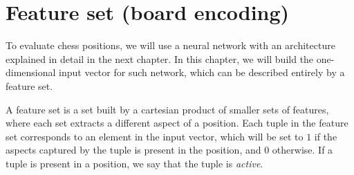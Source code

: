 \newcommand{\white}{\fullmoon}
\newcommand{\black}{\newmoon}

\newcommand{\bigtimes}{\mathop{\raisebox{-0.5ex}{\scalebox{2}{$\times$}}}}

\newcommand{\pieceBoard}{
    \newcount\pieceindex
    \setcounter{pieceindex}{0}
    \raisebox{-7ex}{
        \centering
        \chessboard[
            tinyboard,
            showmover=false,
            margin=false,
            padding=false,
            hlabel=false,
            vlabel=false,
            pgfstyle={text},
            text=\fontsize{1.2ex}{1.2ex}\bfseries\sffamily \currentwq,
            markboard
        ]
    }
}
\newcommand{\pieceRolesTable}{
    \begin{tabular}{|l|}
        \hline
        \sympawn\ Pawn \\
        \hline
        \symknight\ Knight \\
        \hline
        \symbishop\ Bishop \\
        \hline
        \symrook\ Rook \\
        \hline
        \symqueen\ Queen \\
        \hline
        \symking\ King \\
        \hline
    \end{tabular}
}
\newcommand{\pieceColorsTable}{
    \begin{tabular}{|l|}
        \hline
        $\white$ White \\
        \hline
        $\black$ Black \\
        \hline
    \end{tabular}
}

\newcommand{\fs}[1]{\textsc{#1}}


\section{Feature set (board encoding)}

To evaluate chess positions, we will use a neural network with an architecture explained in detail in the next chapter. In this chapter, we will build the one-dimensional input vector for such network, which can be described entirely by a feature set.

A feature set is a set built by a cartesian product of smaller sets of features, where each set extracts a different aspect of a position. Each tuple in the feature set corresponds to an element in the input vector, which will be set to $1$ if the aspects captured by the tuple is present in the position, and $0$ otherwise. If a tuple is present in a position, we say that the tuple is \textit{active}.

